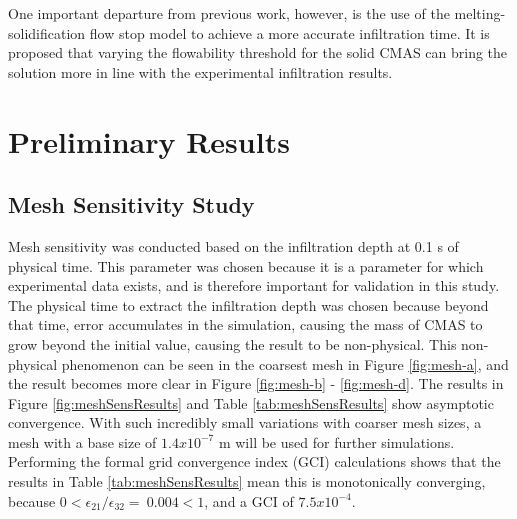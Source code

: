 \documentclass[conf]{new-aiaa}
\begin{document}
One important departure from previous work, however, is the use of the melting-solidification flow stop model to achieve a more accurate infiltration time. It is proposed that varying the flowability threshold for the solid CMAS can bring the solution more in line with the experimental infiltration results. 

\section{Preliminary Results}

\subsection{Mesh Sensitivity Study}
Mesh sensitivity was conducted based on the infiltration depth at 0.1 s of physical time. This parameter was chosen because it is a parameter for which experimental data exists, and is therefore important for validation in this study. The physical time to extract the infiltration depth was chosen because beyond that time, error accumulates in the simulation, causing the mass of CMAS to grow beyond the initial value, causing the result to be non-physical. This non-physical phenomenon can be seen in the coarsest mesh in Figure \ref{fig:mesh-a}, and the result becomes more clear in Figure \ref{fig:mesh-b} - \ref{fig:mesh-d}. The results in Figure \ref{fig:meshSensResults} and Table \ref{tab:meshSensResults} show asymptotic convergence. With such incredibly small variations with coarser mesh sizes, a mesh with a base size of ${1.4x10^{-7}}$ m will be used for further simulations. Performing the formal grid convergence index (GCI) calculations \cite{ECA2014104, celik2008procedure} shows that the results in Table \ref{tab:meshSensResults} mean this is monotonically converging, because  $0<\epsilon_{21}/\epsilon_{32}=\ 0.004<1$, and a GCI of $7.5x10^{-4}$.
\end{document}
